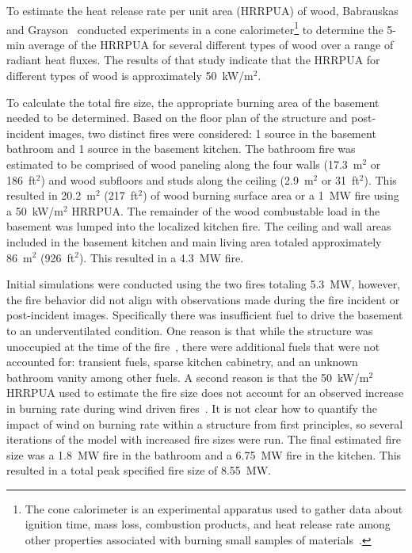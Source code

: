 \documentclass[12pt,oneside]{book}
\begin{document}
To estimate the heat release rate per unit area (HRRPUA) of wood, Babrauskas and Grayson~\cite{babrauskas1990} conducted experiments in a cone calorimeter\footnote{The cone calorimeter is an experimental apparatus used to gather data about ignition time, mass loss, combustion products, and heat release rate among other properties associated with burning small samples of materials~\cite{ASTM:E1355}.} to determine the 5-min average of the HRRPUA for several different types of wood over a range of radiant heat fluxes. The results of that study indicate that the HRRPUA for different types of wood is approximately 50~kW/m$^2$.

To calculate the total fire size, the appropriate burning area of the basement needed to be determined. Based on the floor plan of the structure and post-incident images, two distinct fires were considered: 1 source in the basement bathroom and 1 source in the basement kitchen. The bathroom fire was estimated to be comprised of wood paneling along the four walls (17.3~m$^2$ or 186~ft$^2$) and wood subfloors and studs along the ceiling (2.9~m$^2$ or 31~ft$^2$). This resulted in 20.2~m$^2$ (217~ft$^2$) of wood burning surface area or a 1~MW fire using a 50~kW/m$^2$ HRRPUA. The remainder of the wood combustable load in the basement was lumped into the localized kitchen fire. The ceiling and wall areas included in the basement kitchen and main living area totaled approximately 86~m$^2$ (926~ft$^2$). This resulted in a 4.3~MW fire.

Initial simulations were conducted using the two fires totaling 5.3~MW, however, the fire behavior did not align with observations made during the fire incident or post-incident images. Specifically there was insufficient fuel to drive the basement to an underventilated condition. One reason is that while the structure was unoccupied at the time of the fire~\cite{PGCounty2013}, there were additional fuels that were not accounted for: transient fuels, sparse kitchen cabinetry, and an unknown bathroom vanity among other fuels. A second reason is that the 50~kW/m$^2$ HRRPUA used to estimate the fire size does not account for an observed increase in burning rate during wind driven fires~\cite{madrzykowski2009fire,kerber2009fire}. It is not clear how to quantify the impact of wind on burning rate within a structure from first principles, so several iterations of the model with increased fire sizes were run. The final estimated fire size was a 1.8~MW fire in the bathroom and a 6.75~MW fire in the kitchen. This resulted in a total peak specified fire size of 8.55~MW.
\end{document}
